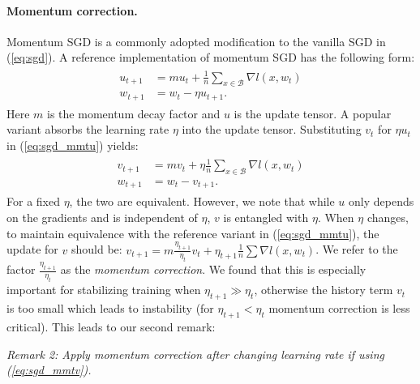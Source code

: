 \documentclass[10pt,twocolumn,letterpaper]{article}
\def\B{\mathcal{B}}
\begin{document}
\paragraph{Momentum correction.} Momentum SGD is a commonly adopted modification to the vanilla SGD in (\ref{eq:sgd}). A reference implementation of momentum SGD has the following form:
\begin{align}\label{eq:sgd_mmtu}\begin{split}
 u_{t+1} &= m u_{t} + \frac{1}{n}\sum_{x\in\B}\nabla l(x,w_t)\\[-.5em]
 w_{t+1} &= w_{t} - \eta u_{t+1}.
\end{split}\end{align}
Here $m$ is the momentum decay factor and $u$ is the update tensor. A popular variant absorbs the learning rate $\eta$ into the update tensor. Substituting $v_t$ for $\eta u_t$ in (\ref{eq:sgd_mmtu}) yields:
\begin{align}\label{eq:sgd_mmtv}\begin{split}
 v_{t+1} &= m v_{t} + \eta\frac{1}{n}\sum_{x\in\B}\nabla l(x,w_t)\\[-.5em]
 w_{t+1} &= w_{t} - v_{t+1}.
\end{split}\end{align}
For a fixed $\eta$, the two are equivalent. However, we note that while $u$ only depends on the gradients and is independent of $\eta$, $v$ is entangled with $\eta$. When $\eta$ changes, to maintain equivalence with the reference variant in (\ref{eq:sgd_mmtu}), the update for $v$ should be: $v_{t+1} = m \frac{\eta_{t+1}}{\eta_{t}} v_{t} + \eta_{t+1} \frac{1}{n}\sum\nabla l(x,w_t)$. We refer to the factor $\frac{\eta_{t+1}}{\eta_{t}}$ as the \emph{momentum correction}. We found that this is especially important for stabilizing training when $\eta_{t+1}\gg\eta_t$, otherwise the history term $v_{t}$ is too small which leads to instability (for $\eta_{t+1}<\eta_t$ momentum correction is less critical). This leads to our second remark:
\begin{center}\begin{minipage}{.75\linewidth}\centering
 \emph{Remark 2: Apply momentum correction after changing learning rate if using (\ref{eq:sgd_mmtv}).}
\end{minipage}\end{center}
\end{document}
